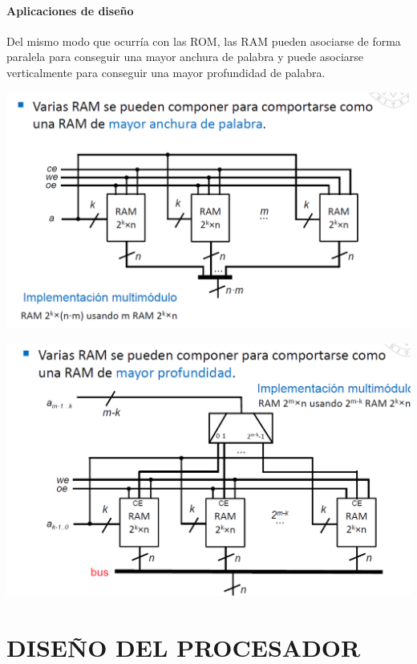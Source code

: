 \documentclass[a4paper,10pt]{book}
\begin{document}
\subsubsection*{Aplicaciones de diseño}
Del mismo modo que ocurría con las ROM, las RAM pueden asociarse de forma paralela para conseguir una mayor anchura de palabra y puede asociarse verticalmente para conseguir una mayor profundidad de palabra.

\begin{center}
\includegraphics[scale=0.45]{RAM anchura}
\end{center}
\begin{center}
\includegraphics[scale=0.45]{RAM profundidad}
\end{center}

\chapter*{DISEÑO DEL PROCESADOR}
\end{document}
